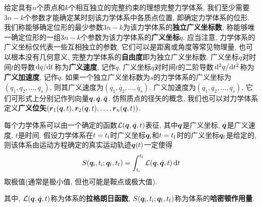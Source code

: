 给定具有$ n $个质点和$ k $个相互独立的完整约束的理想完整力学体系, 我们至少需要$ 3n-k $个参数才能确定某时刻该力学体系中各质点位置, 即确定力学体系的位形. 我们称能够确定位形的最少参数$ 3n-k $为该力学体系的\textbf{独立广义坐标数}, 称能够唯一确定位形的一组$ 3n-k $个参数为该力学体系的\textbf{广义坐标}$ q $. 应当注意, 力学体系的广义坐标仅代表一些互相独立的参数, 它们可以是距离或角度等常见物理量, 也可以根本没有几何意义, 完整力学体系的\textbf{自由度}即为独立广义坐标数. 广义坐标$ q $对时间$ t $的导数$ \dv*{q}{t} $称为\textbf{广义速度}, 记作$ \dot{q} $. 广义坐标$ q $对时间$ t $的二阶导数$ \dv*[2]{q}{t} $称为\textbf{广义加速度}, 记作$ \ddot{q} $. 如果一个独立广义坐标数为$ s $的力学体系的广义坐标为$ (q_1,q_2,\ldots,q_s) $, 则其广义速度为$ (\dot{q_1},\dot{q_2},\ldots,\dot{q_s}) $, 广义加速度为$ (\ddot{q_1},\ddot{q_2},\ldots,\ddot{q_s}) $, 它们可形式上分别记作列向量$ \vb*{q},\dot{\vb*{q}},\ddot{\vb*{q}} $. 仿照质点的径矢的概念, 我们也可以对力学体系定义\textbf{广义位矢}$ (\vb*{r}_1(\vb*{q},t),\vb*{r}_2(\vb*{q},t),\ldots,\vb*{r}_n(\vb*{q},t)) $.

\begin{postulate}[最小作用量原理]\label{pos:最小作用量原理}
    每个力学体系可以由一个确定的函数$ \mathcal{L}(\vb*{q},\dot{\vb*{q}},t) $表征, 其中$ \vb*{q} $是广义坐标, $ \dot{\vb*{q}} $是广义速度, $ t $是时间. 假设力学体系在$ t=t_{\mathrm{i}} $时广义坐标$ \vb*{q}_{\mathrm{i}} $和$ t=t_{\mathrm{f}} $时的广义坐标$ \vb*{q}_{\mathrm{f}} $是给定的, 则该体系由运动方程确定的真实运动轨迹$ \vb*{q}(t) $一定使得
    \begin{equation}
        S(\vb*{q}_{\mathrm{i}},t_{\mathrm{i}};\vb*{q}_{\mathrm{f}},t_{\mathrm{f}})=\int_{t_{\mathrm{i}}}^{t_{\mathrm{f}}} \mathcal{L}(\vb*{q},\dot{\vb*{q}},t) \dd{t}
    \end{equation}
    取极值(通常是极小值, 但也可能是鞍点或极大值).
\end{postulate}
其中, $ \mathcal{L}(\vb*{q},\dot{\vb*{q}},t) $称为体系的\textbf{拉格朗日函数}, $ S(\vb*{q}_{\mathrm{i}},t_{\mathrm{i}};\vb*{q}_{\mathrm{f}},t_{\mathrm{f}}) $称为体系的\textbf{哈密顿作用量}.

